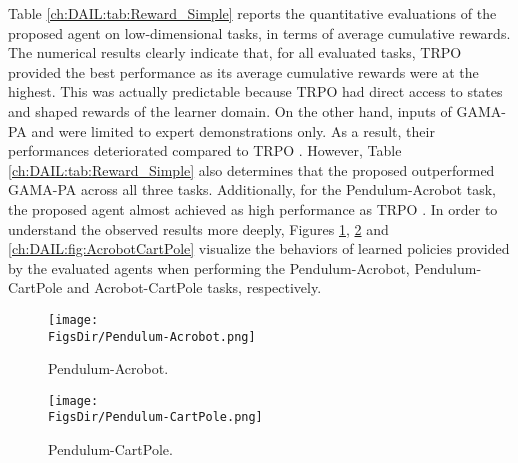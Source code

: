 Table \ref{ch:DAIL:tab:Reward_Simple} reports the quantitative evaluations of the proposed \DAIL{} agent on low-dimensional tasks, in terms of average cumulative rewards.
The numerical results clearly indicate that, for all evaluated tasks, TRPO \cite{RL_TRPO} provided the best performance as its average cumulative rewards were at the highest.
This was actually predictable because TRPO \cite{RL_TRPO} had direct access to states and shaped rewards of the learner domain.
On the other hand, inputs of GAMA-PA \cite{DAIL_Model_DAIL} and \DAIL{} were limited to expert demonstrations only.
As a result, their performances deteriorated compared to TRPO \cite{RL_TRPO}.
However, Table \ref{ch:DAIL:tab:Reward_Simple} also determines that the proposed \DAIL{} outperformed GAMA-PA \cite{DAIL_Model_DAIL} across all three tasks.
Additionally, for the Pendulum-Acrobot task, the proposed agent almost achieved as high performance as TRPO \cite{RL_TRPO}.
In order to understand the observed results more deeply, Figures \ref{ch:DAIL:fig:PendulumAcrobot}, \ref{ch:DAIL:fig:PendulumCartPole} and \ref{ch:DAIL:fig:AcrobotCartPole} visualize the behaviors of learned policies provided by the evaluated agents when performing the Pendulum-Acrobot, Pendulum-CartPole and Acrobot-CartPole tasks, respectively.

\begin{table}[htbp!]
  \centering
  \caption{}
  \label{ch:DAIL:tab:Reward_Simple}
  
\end{table}

\begin{landscape}
  \begin{figure}[htbp!]
    \centering
    \texttt{[image: \\FigsDir/Pendulum-Acrobot.png]}
    \caption{Pendulum-Acrobot.}
    \label{ch:DAIL:fig:PendulumAcrobot}
  \end{figure}
\end{landscape}


\begin{landscape}
  \begin{figure}[htbp!]
    \centering
    \texttt{[image: \\FigsDir/Pendulum-CartPole.png]}
    \caption{Pendulum-CartPole.}
    \label{ch:DAIL:fig:PendulumCartPole}
  \end{figure}
\end{landscape}

